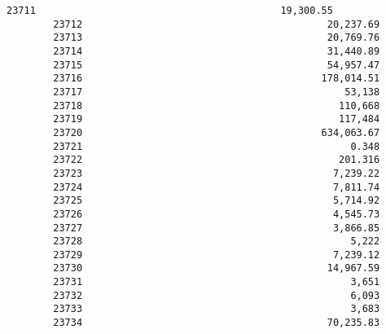 \documentclass[11pt]{article}
\begin{document}
\begin{Verbatim}[commandchars=\\\{\}]
        23711                                          19,300.55   
        23712                                          20,237.69   
        23713                                          20,769.76   
        23714                                          31,440.89   
        23715                                          54,957.47   
        23716                                         178,014.51   
        23717                                             53,138   
        23718                                            110,668   
        23719                                            117,484   
        23720                                         634,063.67   
        23721                                              0.348   
        23722                                            201.316   
        23723                                           7,239.22   
        23724                                           7,811.74   
        23725                                           5,714.92   
        23726                                           4,545.73   
        23727                                           3,866.85   
        23728                                              5,222   
        23729                                           7,239.12   
        23730                                          14,967.59   
        23731                                              3,651   
        23732                                              6,093   
        23733                                              3,683   
        23734                                          70,235.83   
        

\end{Verbatim}
\end{document}
